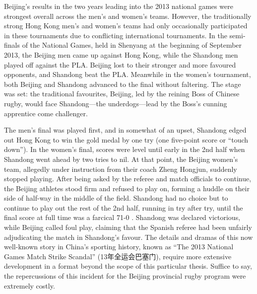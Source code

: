 \begin{CJK}{UTF8}{gbsn}
Beijing's results in the two years leading into the 2013 national games were strongest overall across the men's and women's teams.   However, the traditionally strong Hong Kong men's and women's teams had only occasionally participated in these tournaments due to conflicting international tournaments.  In the semi-finals of the National Games, held in Shenyang at the beginning of September 2013, the Beijing men came up against Hong Kong, while the Shandong men played off against the PLA.  Beijing lost to their stronger and more favoured opponents, and Shandong beat the PLA.  Meanwhile in the women's tournament, both Beijing and Shandong advanced to the final without faltering.  The stage was set: the traditional favourites, Beijing, led by the reining Boss of Chinese rugby, would face Shandong---the underdogs---lead by the Boss's cunning apprentice come challenger.

The men's final was played first, and in somewhat of an upset, Shandong edged out Hong Kong to win the gold medal by one try (one five-point score or ``touch down'').  In the women's final, scores were level until early in the 2nd half when Shandong went ahead by two tries to nil.  At that point, the Beijing women's team, allegedly under instruction from their coach Zheng Hongjun, suddenly stopped playing.  After being asked by the referee and match officials to continue, the Beijing athletes stood firm and refused to play on, forming a huddle on their side of half-way in the middle of the field. Shandong had no choice but to continue to play out the rest of the 2nd half, running in try after try, until the final score at full time was a farcical 71-0 \citep{Sina2013}.  Shandong was declared victorious, while Beijing called foul play, claiming that the Spanish referee had been unfairly adjudicating the match in Shandong's favour.  The details and dramas of this now well-known story in China's sporting history, known as ``The 2013 National Games Match Strike Scandal'' (13年全运会巴塞门), require more extensive development in a format beyond the scope of this particular thesis.  Suffice to say, the repercussions of this incident for the Beijing provincial rugby program were extremely costly.


\end{CJK}
